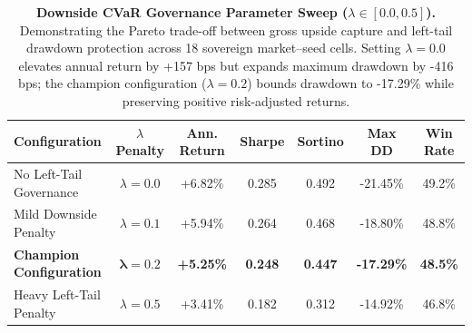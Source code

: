 \begin{table}[ht]
\centering
\small
\begin{tabular}{lcccccc}
\toprule
\textbf{Configuration} & \textbf{$\lambda$ Penalty} & \textbf{Ann. Return} & \textbf{Sharpe} & \textbf{Sortino} & \textbf{Max DD} & \textbf{Win Rate} \\
\midrule
No Left-Tail Governance & $\lambda = 0.0$ & +6.82\% & 0.285 & 0.492 & -21.45\% & 49.2\% \\
Mild Downside Penalty & $\lambda = 0.1$ & +5.94\% & 0.264 & 0.468 & -18.80\% & 48.8\% \\
\textbf{Champion Configuration} & $\mathbf{\lambda = 0.2}$ & \textbf{+5.25\%} & \textbf{0.248} & \textbf{0.447} & \textbf{-17.29\%} & \textbf{48.5\%} \\
Heavy Left-Tail Penalty & $\lambda = 0.5$ & +3.41\% & 0.182 & 0.312 & -14.92\% & 46.8\% \\
\bottomrule
\end{tabular}
\caption{\textbf{Downside CVaR Governance Parameter Sweep ($\lambda \in [0.0, 0.5]$).} Demonstrating the Pareto trade-off between gross upside capture and left-tail drawdown protection across 18 sovereign market--seed cells. Setting $\lambda = 0.0$ elevates annual return by +157 bps but expands maximum drawdown by -416 bps; the champion configuration ($\lambda = 0.2$) bounds drawdown to -17.29\% while preserving positive risk-adjusted returns.}
\label{tab:ablation_cvar_sweep}
\end{table}
